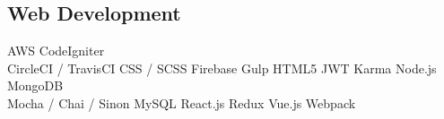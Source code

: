 \documentclass[]{constants}
\begin{document}
\begin{minipage}[t]{0.30\textwidth}
\subsection{Web Development}
AWS \textbullet{}
CodeIgniter \textbullet{}
\\ CircleCI / TravisCI \textbullet{}
CSS / SCSS \textbullet{}
Firebase \textbullet{}
Gulp \textbullet{}
HTML5 \textbullet{}
JWT \textbullet{}
Karma \textbullet{}
Node.js \textbullet{}
MongoDB \textbullet{} 
\\ Mocha / Chai / Sinon \textbullet{} 
MySQL \textbullet{}
React.js \textbullet{}
Redux \textbullet{}
Vue.js \textbullet{} 
Webpack %
\newline


%
%

\end{minipage} 
\hfill
\end{document}
